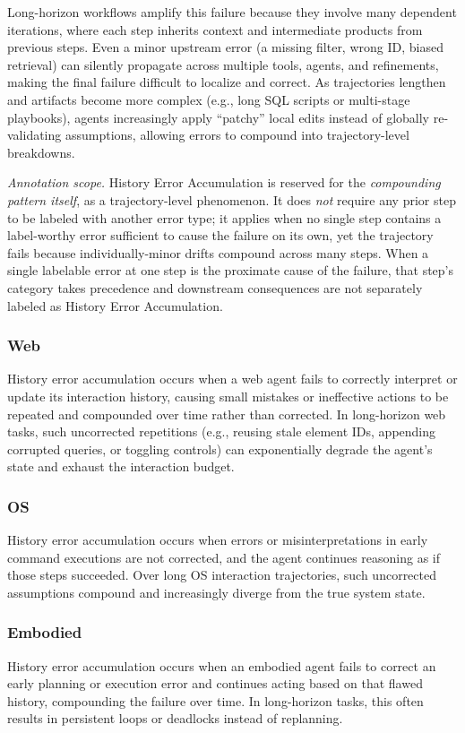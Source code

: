 \documentclass[11pt]{article}
\begin{document}
Long-horizon workflows amplify this failure because they involve many dependent iterations, where each step inherits context and intermediate products from previous steps. Even a minor upstream error (a missing filter, wrong ID, biased retrieval) can silently propagate across multiple tools, agents, and refinements, making the final failure difficult to localize and correct. As trajectories lengthen and artifacts become more complex (e.g., long SQL scripts or multi-stage playbooks), agents increasingly apply “patchy” local edits instead of globally re-validating assumptions, allowing errors to compound into trajectory-level breakdowns.

\textit{Annotation scope.} History Error Accumulation is reserved for the \emph{compounding pattern itself}, as a trajectory-level phenomenon. It does \emph{not} require any prior step to be labeled with another error type; it applies when no single step contains a label-worthy error sufficient to cause the failure on its own, yet the trajectory fails because individually-minor drifts compound across many steps. When a single labelable error at one step is the proximate cause of the failure, that step's category takes precedence and downstream consequences are not separately labeled as History Error Accumulation.

\subsubsection{Web}
History error accumulation occurs when a web agent fails to correctly interpret or update its interaction history, causing small mistakes or ineffective actions to be repeated and compounded over time rather than corrected. In long-horizon web tasks, such uncorrected repetitions (e.g., reusing stale element IDs, appending corrupted queries, or toggling controls) can exponentially degrade the agent’s state and exhaust the interaction budget.

\subsubsection{OS}
History error accumulation occurs when errors or misinterpretations in early command executions are not corrected, and the agent continues reasoning as if those steps succeeded. Over long OS interaction trajectories, such uncorrected assumptions compound and increasingly diverge from the true system state.

\subsubsection{Embodied}
History error accumulation occurs when an embodied agent fails to correct an early planning or execution error and continues acting based on that flawed history, compounding the failure over time. In long-horizon tasks, this often results in persistent loops or deadlocks instead of replanning.
\end{document}

